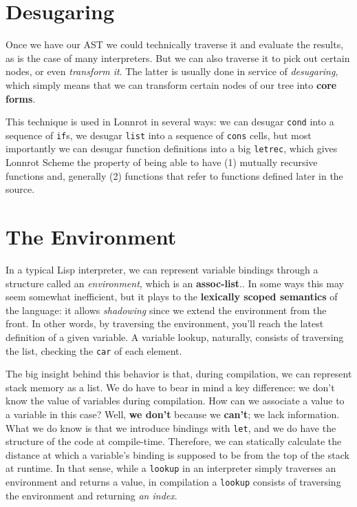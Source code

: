 \section{Desugaring}\label{sec:ch2_desugar}
Once we have our AST we could technically traverse it and evaluate the results, as
is the case of many interpreters. But we can also traverse it to pick out certain nodes, or even
\textit{transform it}. The latter is usually done in service of \textit{desugaring}, which simply
means that we can transform certain nodes of our tree into \textbf{core forms}.

This technique is used in Lonnrot in several ways: we can desugar \texttt{cond} into a sequence of
\texttt{if}s, we desugar \texttt{list} into a sequence of \texttt{cons} cells, but most importantly
we can desugar function definitions into a big \texttt{letrec}, which gives Lonnrot Scheme the
property of being able to have (1) mutually recursive functions and, generally (2) functions that
refer to functions defined later in the source.

\section{The Environment}\label{sec:ch2_env}
In a typical Lisp interpreter, we can represent variable bindings through a structure
called an \textit{environment}, which is an \textbf{assoc-list}.. In some ways
this may seem somewhat inefficient, but it plays to the \textbf{lexically scoped semantics} of the
language: it allows \textit{shadowing} since we extend the environment from the front. In other words,
by traversing the environment, you'll reach the latest definition of a given variable. A variable lookup,
naturally, consists of traversing the list, checking the \texttt{car} of each element.

The big insight behind this behavior is that, during compilation, we can represent stack memory as
a list. We do have to bear in mind a key difference: we don't know the value of variables during
compilation. How can we associate a value to a variable in this case? Well, \textbf{we don't} because
we \textbf{can't}; we lack information. What we do know is that we introduce bindings with
\texttt{let}, and we do have the structure of the code at compile-time. Therefore, we can
statically calculate the distance at which a variable's binding is supposed to be from the top
of the stack at runtime. In that sense, while a \texttt{lookup} in an interpreter simply traverses
an environment and returns a value, in compilation a \texttt{lookup} consists of traversing
the environment and returning \textit{an index}.
